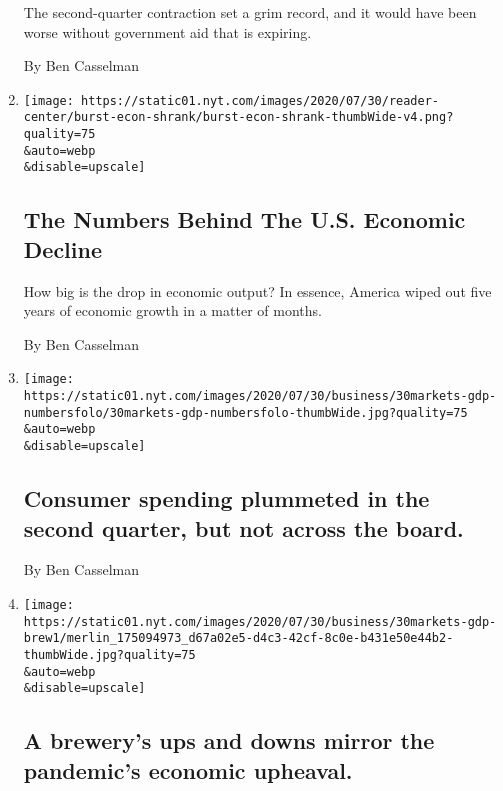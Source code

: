 \begin{enumerate}
  The second-quarter contraction set a grim record, and it would have
  been worse without government aid that is expiring.

  By Ben Casselman
\item
  \href{/interactive/2020/07/30/business/economy-gdp-unemployment.html}{}

  \texttt{[image: https://static01.nyt.com/images/2020/07/30/reader-center/burst-econ-shrank/burst-econ-shrank-thumbWide-v4.png?quality=75\\\&auto=webp\\\&disable=upscale]}

  \hypertarget{the-numbers-behind-the-us-economic-decline}{%
  \subsection{The Numbers Behind The U.S. Economic
  Decline}\label{the-numbers-behind-the-us-economic-decline}}

  How big is the drop in economic output? In essence, America wiped out
  five years of economic growth in a matter of months.

  By Ben Casselman
\item
  \href{/live/2020/07/30/business/stock-market-today-coronavirus/consumer-spending-plummeted-in-the-second-quarter-but-not-across-the-board}{}

  \texttt{[image: https://static01.nyt.com/images/2020/07/30/business/30markets-gdp-numbersfolo/30markets-gdp-numbersfolo-thumbWide.jpg?quality=75\\\&auto=webp\\\&disable=upscale]}

  \hypertarget{consumer-spending-plummeted-in-the-second-quarter-but-not-across-the-board}{%
  \subsection{Consumer spending plummeted in the second quarter, but not
  across the
  board.}\label{consumer-spending-plummeted-in-the-second-quarter-but-not-across-the-board}}

  By Ben Casselman
\item
  \href{/2020/07/30/business/a-brewerys-ups-and-downs-mirror-the-pandemics-economic-upheaval.html}{}

  \texttt{[image: https://static01.nyt.com/images/2020/07/30/business/30markets-gdp-brew1/merlin\_175094973\_d67a02e5-d4c3-42cf-8c0e-b431e50e44b2-thumbWide.jpg?quality=75\\\&auto=webp\\\&disable=upscale]}

  \hypertarget{a-brewerys-ups-and-downs-mirror-the-pandemics-economic-upheaval}{%
  \subsection{A brewery's ups and downs mirror the pandemic's economic
  upheaval.}\label{a-brewerys-ups-and-downs-mirror-the-pandemics-economic-upheaval}}


\end{enumerate}
